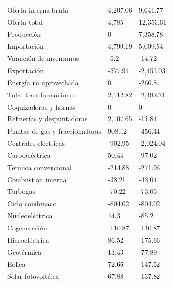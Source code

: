 \documentclass{sener2025}
\begin{document}
\begin{tabladoradoLargo}
\begin{xltabular}{\textwidth}{YZZ}
    Oferta interna bruta & 4,207.06 & 9,641.77 \\
    \hspace{1.35em} Oferta total & 4,785 & 12,353.61 \\
    \hspace{2.7em} Producción & 0 & 7,358.78 \\
    \hspace{2.7em} Importación & 4,790.19 & 5,009.54 \\
    \hspace{2.7em} Variación de inventarios & -5.2 & -14.72 \\
    \hspace{1.35em} Exportación & -577.94 & -2,451.03 \\
    \hspace{1.35em} Energía no aprovechada & 0 & -260.8 \\
    Total transformaciones & 2,112.82 & -2,492.31 \\
    \hspace{1.35em} Coquizadoras y hornos & 0 & 0 \\
    \hspace{1.35em} Refinerías y despuntadoras & 2,107.65 & -11.84 \\
    \hspace{1.35em} Plantas de gas y fraccionadoras & 908.12 & -456.44 \\
    \hspace{1.35em} Centrales eléctricas & -902.95 & -2,024.04 \\
    \hspace{2.7em} Carboeléctrica & 50.44 & -97.02 \\
    \hspace{2.7em} Térmica convencional & -214.88 & -271.96 \\
    \hspace{2.7em} Combustión interna & -38.21 & -43.04 \\
    \hspace{2.7em} Turbogas & -70.22 & -73.05 \\
    \hspace{2.7em} Ciclo combinado & -804.02 & -804.02 \\
    \hspace{2.7em} Nucleoeléctrica & 44.3 & -85.2 \\
    \hspace{2.7em} Cogeneración & -110.87 & -110.87 \\
    \hspace{2.7em} Hidroeléctrica & 86.52 & -175.66 \\
    \hspace{2.7em} Geotérmica & 13.43 & -77.89 \\
    \hspace{2.7em} Eólica & 72.66 & -147.52 \\
    \hspace{2.7em} Solar fotovoltáica & 67.88 & -137.82 \\
  \end{xltabular}
\end{tabladoradoLargo}
\end{document}
